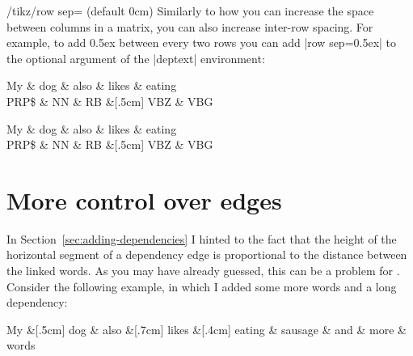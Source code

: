 \documentclass[a4paper]{ltxdoc}
\begin{document}
\begin{key}{/tikz/row sep= (default 0cm)}
   Similarly to how you can increase the space between columns in a matrix, you can also increase inter-row spacing. For example, to add 0.5ex between every two rows you can add |row sep=0.5ex| to the optional argument of the |deptext| environment:
\begin{codeexample}[]
\begin{dependency}
   \begin{deptext}[column sep=.7cm, row sep=.5ex]
      My \& dog \& also \& likes \& eating\\
      PRP\$ \& NN \& RB \&[.5cm] VBZ \& VBG\\
   \end{deptext}
   \qquad
\end{dependency}
\quad
\begin{dependency}
   \begin{deptext}[column sep=.7cm, row sep=2ex]
      My \& dog \& also \& likes \& eating\\
      PRP\$ \& NN \& RB \&[.5cm] VBZ \& VBG\\
   \end{deptext}
\end{dependency}
\end{codeexample}
\end{key}

\section{More control over edges}

In Section~\ref{sec:adding-dependencies} I hinted to the fact that the height of the horizontal segment of a dependency edge is proportional to the distance between the linked words. As you may have already guessed, this can be a problem for . Consider the following example, in which I added some more words and a long dependency:

\begin{codeexample}[]
\begin{dependency}
   \begin{deptext}[column sep=0.2cm]
      My \&[.5cm] dog \& also \&[.7cm] likes \&[.4cm] eating \& sausage \& and \& more \& words \\
   \end{deptext}
\end{dependency}
\end{codeexample}
\end{document}
